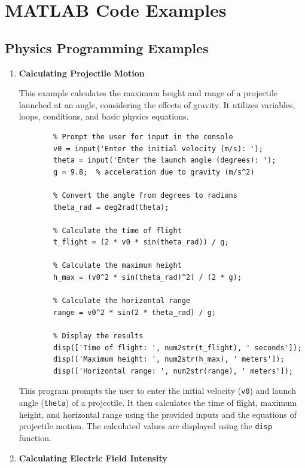 \documentclass[
11pt, %
a4paper, %
oneside, %
headinclude,footinclude, %
BCOR5mm, %
]{scrartcl}
\begin{document}
\section{MATLAB Code Examples}
\subsection{Physics Programming Examples}

\begin{enumerate}
	\item \textbf{Calculating Projectile Motion}
	
	This example calculates the maximum height and range of a projectile launched at an angle, considering the effects of gravity. It utilizes variables, loops, conditions, and basic physics equations.
	
	\begin{verbatim}
		% Prompt the user for input in the console
		v0 = input('Enter the initial velocity (m/s): ');
		theta = input('Enter the launch angle (degrees): ');
		g = 9.8;  % acceleration due to gravity (m/s^2)
		
		% Convert the angle from degrees to radians
		theta_rad = deg2rad(theta);
		
		% Calculate the time of flight
		t_flight = (2 * v0 * sin(theta_rad)) / g;
		
		% Calculate the maximum height
		h_max = (v0^2 * sin(theta_rad)^2) / (2 * g);
		
		% Calculate the horizontal range
		range = v0^2 * sin(2 * theta_rad) / g;
		
		% Display the results
		disp(['Time of flight: ', num2str(t_flight), ' seconds']);
		disp(['Maximum height: ', num2str(h_max), ' meters']);
		disp(['Horizontal range: ', num2str(range), ' meters']);
	\end{verbatim}
	
	This program prompts the user to enter the initial velocity (\texttt{v0}) and launch angle (\texttt{theta}) of a projectile. It then calculates the time of flight, maximum height, and horizontal range using the provided inputs and the equations of projectile motion. The calculated values are displayed using the \texttt{disp} function.
	
	\item \textbf{Calculating Electric Field Intensity}
	

\end{enumerate}
\end{document}
